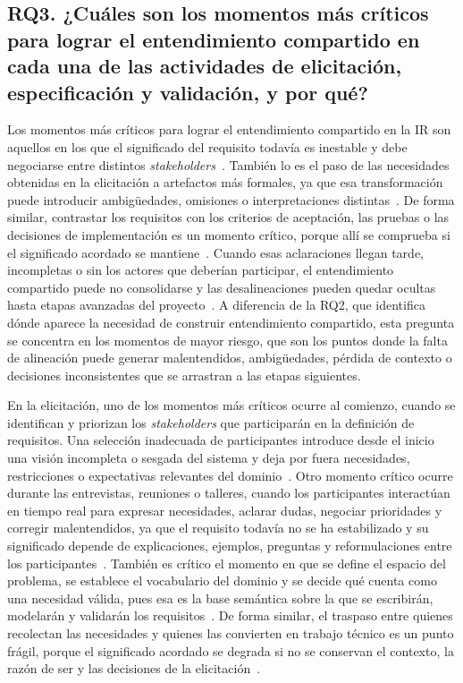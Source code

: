 \documentclass[12pt,letterpaper,oneside]{report}
\begin{document}
\subsection{RQ3. ¿Cuáles son los momentos más críticos para lograr el
entendimiento compartido en cada una de las actividades de elicitación,
especificación y validación, y por qué?}
Los momentos más críticos para lograr el entendimiento compartido en la IR son
aquellos en los que el significado del requisito todavía es inestable y debe
negociarse entre distintos \textit{stakeholders}~\cite{balasubramaniam2023}.
También lo es el paso de las necesidades obtenidas en la elicitación a
artefactos más formales, ya que esa transformación puede introducir
ambigüedades, omisiones o interpretaciones distintas~\cite{ribeiro2020}. De
forma similar, contrastar los requisitos con los criterios de aceptación, las
pruebas o las decisiones de implementación es un momento crítico, porque allí
se comprueba si el significado acordado se mantiene~\cite{laporte2023}. Cuando
esas aclaraciones llegan tarde, incompletas o sin los actores que deberían
participar, el entendimiento compartido puede no consolidarse y las
desalineaciones pueden quedar ocultas hasta etapas avanzadas del
proyecto~\cite{sherif2023}. A diferencia de la RQ2, que identifica dónde aparece la necesidad de construir
entendimiento compartido, esta pregunta se concentra en los momentos de mayor
riesgo, que son los puntos donde la falta de alineación puede generar
malentendidos, ambigüedades, pérdida de contexto o decisiones inconsistentes
que se arrastran a las etapas siguientes.

En la elicitación, uno de los momentos más críticos ocurre al comienzo, cuando
se identifican y priorizan los \textit{stakeholders} que participarán en la
definición de requisitos. Una selección inadecuada de participantes introduce
desde el inicio una visión incompleta o sesgada del sistema y deja por fuera
necesidades, restricciones o expectativas relevantes del
dominio~\cite{khan2022stakeholders}. Otro momento crítico ocurre durante las
entrevistas, reuniones o talleres, cuando los participantes interactúan en
tiempo real para expresar necesidades, aclarar dudas, negociar prioridades y
corregir malentendidos, ya que el requisito todavía no se ha estabilizado y su
significado depende de explicaciones, ejemplos, preguntas y reformulaciones
entre los participantes~\cite{calefato2015}. También es crítico el momento en
que se define el espacio del problema, se establece el vocabulario del dominio
y se decide qué cuenta como una necesidad válida, pues esa es la base semántica
sobre la que se escribirán, modelarán y validarán los
requisitos~\cite{antonelli2016}. De forma similar, el traspaso entre quienes
recolectan las necesidades y quienes las convierten en trabajo técnico es un punto
frágil, porque el significado acordado se degrada si no se conservan el
contexto, la razón de ser y las decisiones de la elicitación~\cite{kunz2016}.
\end{document}
